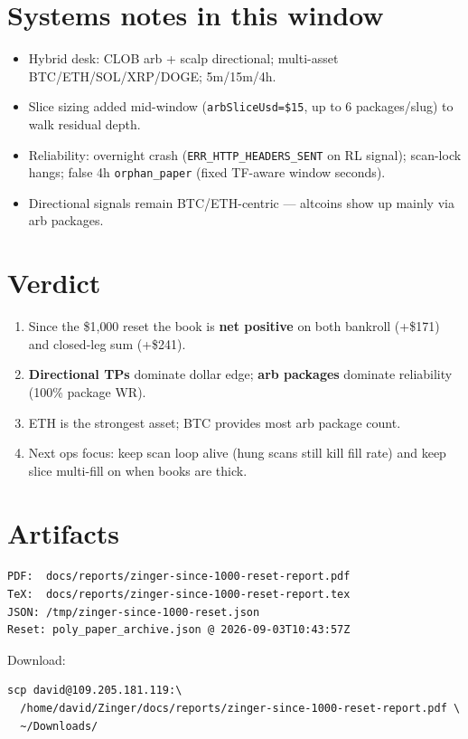 \documentclass[11pt,a4paper]{article}
\begin{document}
\section{Systems notes in this window}
\begin{itemize}[leftmargin=*,itemsep=0.35em]
  \item Hybrid desk: CLOB arb + scalp directional; multi-asset BTC/ETH/SOL/XRP/DOGE; 5m/15m/4h.
  \item Slice sizing added mid-window (\texttt{arbSliceUsd=\$15}, up to 6 packages/slug) to walk residual depth.
  \item Reliability: overnight crash (\texttt{ERR\_HTTP\_HEADERS\_SENT} on RL signal); scan-lock hangs; false 4h \texttt{orphan\_paper} (fixed TF-aware window seconds).
  \item Directional signals remain BTC/ETH-centric --- altcoins show up mainly via arb packages.
\end{itemize}

\section{Verdict}
\begin{enumerate}[leftmargin=*,itemsep=0.35em]
  \item Since the \$1{,}000 reset the book is \textbf{net positive} on both bankroll (+\$171) and closed-leg sum (+\$241).
  \item \textbf{Directional TPs} dominate dollar edge; \textbf{arb packages} dominate reliability (100\% package WR).
  \item ETH is the strongest asset; BTC provides most arb package count.
  \item Next ops focus: keep scan loop alive (hung scans still kill fill rate) and keep slice multi-fill on when books are thick.
\end{enumerate}

\section{Artifacts}
\begin{verbatim}
PDF:  docs/reports/zinger-since-1000-reset-report.pdf
TeX:  docs/reports/zinger-since-1000-reset-report.tex
JSON: /tmp/zinger-since-1000-reset.json
Reset: poly_paper_archive.json @ 2026-09-03T10:43:57Z
\end{verbatim}

\noindent
Download:
\begin{verbatim}
scp david@109.205.181.119:\
  /home/david/Zinger/docs/reports/zinger-since-1000-reset-report.pdf \
  ~/Downloads/
\end{verbatim}
\end{document}
